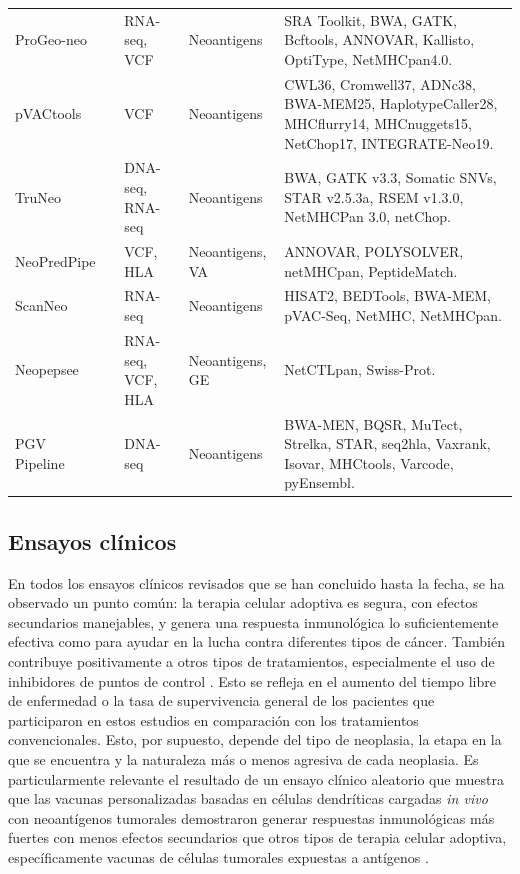 \begin{table}[h]
{{\begin{tabular}{lp{2cm}p{2cm}p{2cm}p{5cm}}
				ProGeo-neo & \cite{li2020progeo} & RNA-seq, VCF & Neoantigens & SRA Toolkit, BWA, GATK, Bcftools, ANNOVAR, Kallisto, OptiType, NetMHCpan4.0. \\
				pVACtools & \cite{hundal2020pvactools} & VCF & Neoantigens & CWL36, Cromwell37, ADNc38, BWA-MEM25, HaplotypeCaller28, MHCflurry14, MHCnuggets15, NetChop17, INTEGRATE-Neo19. \\
				TruNeo &  \cite{tang2020truneo} & DNA-seq, RNA-seq & Neoantigens & BWA, GATK v3.3, Somatic SNVs, STAR v2.5.3a, RSEM v1.3.0, NetMHCPan 3.0, netChop. \\
				NeoPredPipe & \cite{schenck2019neopredpipe} & VCF, HLA & Neoantigens, VA & ANNOVAR, POLYSOLVER, netMHCpan, PeptideMatch. \\
				ScanNeo & \cite{wang2019scanneo} & RNA-seq  & Neoantigens & HISAT2, BEDTools, BWA-MEM, pVAC-Seq, NetMHC, NetMHCpan. \\
				Neopepsee & \cite{kim2018neopepsee} & RNA-seq, VCF, HLA & Neoantigens, GE & NetCTLpan, Swiss-Prot. \\ 
				PGV Pipeline & \cite{rubinsteyn2018computational}& DNA-seq & Neoantigens & BWA-MEN, BQSR, MuTect, Strelka, STAR, seq2hla, Vaxrank, Isovar, MHCtools, Varcode, pyEnsembl. \\
			\end{tabular}
		}
	}
\end{table}


\subsection{Ensayos clínicos}


En todos los ensayos clínicos revisados que se han concluido hasta la fecha, se ha observado un punto común: la terapia celular adoptiva es segura, con efectos secundarios manejables, y genera una respuesta inmunológica lo suficientemente efectiva como para ayudar en la lucha contra diferentes tipos de cáncer. También contribuye positivamente a otros tipos de tratamientos, especialmente el uso de inhibidores de puntos de control \cite{awad2022personalized, ott2020phase, holm2022neoantigen, rocconi2022proof, poran2020combined, bassani2019phase}. Esto se refleja en el aumento del tiempo libre de enfermedad o la tasa de supervivencia general de los pacientes que participaron en estos estudios en comparación con los tratamientos convencionales. Esto, por supuesto, depende del tipo de neoplasia, la etapa en la que se encuentra y la naturaleza más o menos agresiva de cada neoplasia. Es particularmente relevante el resultado de un ensayo clínico aleatorio que muestra que las vacunas personalizadas basadas en células dendríticas cargadas \textit{in vivo} con neoantígenos tumorales demostraron generar respuestas inmunológicas más fuertes con menos efectos secundarios que otros tipos de terapia celular adoptiva, específicamente vacunas de células tumorales expuestas a antígenos \cite{dillman2018randomized}.

